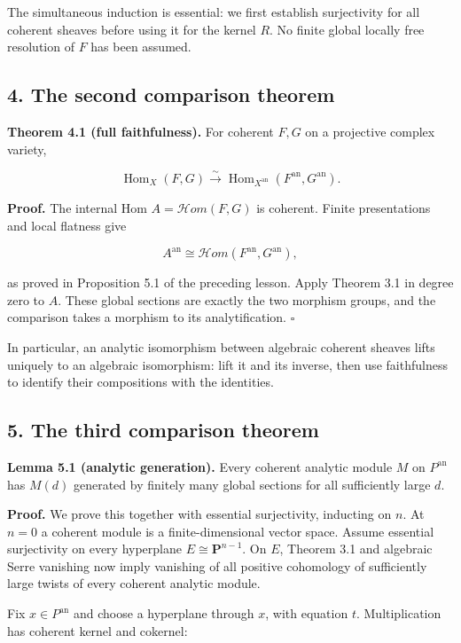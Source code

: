 \documentclass[11pt]{article}
\begin{document}
The simultaneous induction is essential: we first establish surjectivity
for all coherent sheaves before using it for the kernel \(R\). No finite
global locally free resolution of \(F\) has been assumed.

\subsection{4. The second comparison
theorem}\label{the-second-comparison-theorem}

\textbf{Theorem 4.1 (full faithfulness).} For coherent \(F,G\) on a
projective complex variety,

\[
\operatorname{Hom}_X(F,G)
\xrightarrow{\sim}
\operatorname{Hom}_{X^{\mathrm{an}}}(F^{\mathrm{an}},G^{\mathrm{an}}).
\]

\textbf{Proof.} The internal Hom \(A=\mathcal Hom(F,G)\) is coherent.
Finite presentations and local flatness give

\[
A^{\mathrm{an}}\cong\mathcal Hom(F^{\mathrm{an}},G^{\mathrm{an}}),
\]

as proved in Proposition 5.1 of the preceding lesson. Apply Theorem 3.1
in degree zero to \(A\). These global sections are exactly the two
morphism groups, and the comparison takes a morphism to its
analytification. \(\square\)

In particular, an analytic isomorphism between algebraic coherent
sheaves lifts uniquely to an algebraic isomorphism: lift it and its
inverse, then use faithfulness to identify their compositions with the
identities.

\subsection{5. The third comparison
theorem}\label{the-third-comparison-theorem}

\textbf{Lemma 5.1 (analytic generation).} Every coherent analytic module
\(M\) on \(P^{\mathrm{an}}\) has \(M(d)\) generated by finitely many
global sections for all sufficiently large \(d\).

\textbf{Proof.} We prove this together with essential surjectivity,
inducting on \(n\). At \(n=0\) a coherent module is a finite-dimensional
vector space. Assume essential surjectivity on every hyperplane
\(E\cong\mathbf P^{n-1}\). On \(E\), Theorem 3.1 and algebraic Serre
vanishing now imply vanishing of all positive cohomology of sufficiently
large twists of every coherent analytic module.

Fix \(x\in P^{\mathrm{an}}\) and choose a hyperplane through \(x\), with
equation \(t\). Multiplication has coherent kernel and cokernel:
\end{document}
